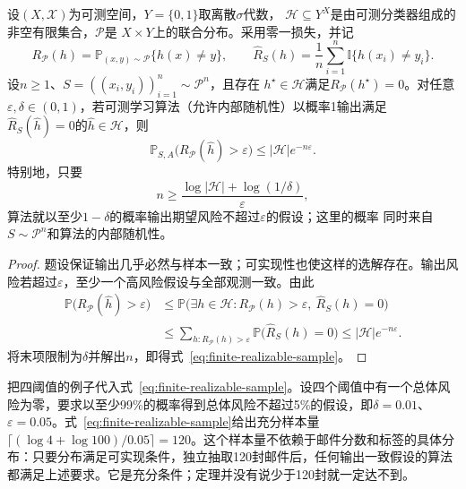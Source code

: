 \begin{theorem}[有限假设空间的可实现PAC样本量界]
\label{thm:finite-realizable-pac}
设$(X,\mathcal X)$为可测空间，$Y=\{0,1\}$取离散$\sigma$代数，
$\mathcal H\subseteq Y^X$是由可测分类器组成的非空有限集合，$\mathcal P$是
$X\times Y$上的联合分布。采用零一损失，并记
\[
 R_{\mathcal P}(h)=\mathbb P_{(x,y)\sim\mathcal P}\{h(x)\neq y\},\qquad
 \hat R_S(h)=\frac1n\sum_{i=1}^n\mathbb I\{h(x_i)\neq y_i\}.
\]
设$n\geq1$、$S=((x_i,y_i))_{i=1}^n\sim\mathcal P^n$，且存在
$h^\star\in\mathcal H$满足$R_{\mathcal P}(h^\star)=0$。对任意
$\varepsilon,\delta\in(0,1)$，若可测学习算法（允许内部随机性）以概率1输出满足
$\hat R_S(\hat h)=0$的$\hat h\in\mathcal H$，则
\begin{equation}
  \mathbb P_{S,A}\bigl(R_{\mathcal P}(\hat h)>\varepsilon\bigr)
  \leq |\mathcal H|e^{-n\varepsilon}.
  \label{eq:finite-realizable-failure}
\end{equation}
特别地，只要
\begin{equation}
  n\geq\frac{\log|\mathcal H|+\log(1/\delta)}{\varepsilon},
  \label{eq:finite-realizable-sample}
\end{equation}
算法就以至少$1-\delta$的概率输出期望风险不超过$\varepsilon$的假设；这里的概率
同时来自$S\sim\mathcal P^n$和算法的内部随机性。
\end{theorem}

\begin{proof}
题设保证输出几乎必然与样本一致；可实现性也使这样的选解存在。输出风险若超过$\varepsilon$，至少一个高风险假设与全部观测一致。由此
\begin{align*}
 \mathbb P\bigl(R_{\mathcal P}(\hat h)>\varepsilon\bigr)
 &\leq \mathbb P\bigl(\exists h\in\mathcal H:
       R_{\mathcal P}(h)>\varepsilon,\ \hat R_S(h)=0\bigr)\\
 &\leq\sum_{h:R_{\mathcal P}(h)>\varepsilon}
       \mathbb P\bigl(\hat R_S(h)=0\bigr)
 \leq |\mathcal H|e^{-n\varepsilon}.
\end{align*}
将末项限制为$\delta$并解出$n$，即得式~\eqref{eq:finite-realizable-sample}。
\end{proof}

把四阈值的例子代入式~\eqref{eq:finite-realizable-sample}。设四个阈值中有一个总体风险为零，要求以至少99\%的概率得到总体风险不超过5\%的假设，即$\delta=0.01$、$\varepsilon=0.05$。式~\eqref{eq:finite-realizable-sample}给出充分样本量$\lceil(\log4+\log100)/0.05\rceil=120$。这个样本量不依赖于邮件分数和标签的具体分布：只要分布满足可实现条件，独立抽取120封邮件后，任何输出一致假设的算法都满足上述要求。它是充分条件；定理并没有说少于120封就一定达不到。

